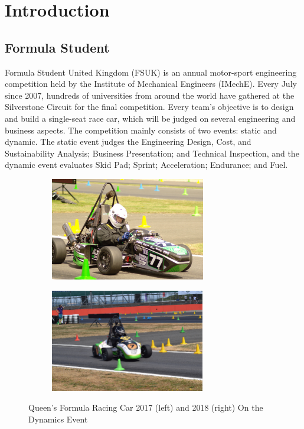 \newpage
\setcounter{page}{1}
\justifying
\noindent

\section{Introduction}
\subsection{Formula Student}
Formula Student United Kingdom (FSUK) is an annual motor-sport engineering competition held by the Institute of Mechanical Engineers (IMechE). Every July since 2007, hundreds of universities from around the world have gathered at the Silverstone Circuit for the final competition. Every team's objective is to design and build a single-seat race car, which will be judged on several engineering and business aspects. The competition mainly consists of two events: static and dynamic. The static event judges the Engineering  Design,  Cost, and  Sustainability  Analysis; Business Presentation; and Technical Inspection, and the dynamic event evaluates Skid Pad; Sprint; Acceleration; Endurance; and Fuel.

\begin{figure}[!ht]
\begin{center}
%    
  \begin{subfigure}[b]{0.45\textwidth}
    \includegraphics[height=4.5cm]{Figures/QFR17PHOTO.JPG}
  \end{subfigure}
  \begin{subfigure}[b]{0.45\textwidth}
    \includegraphics[height=4.5cm]{Figures/QFR18PHOTO.jpg}
  \end{subfigure}
%  
  \caption{Queen's Formula Racing Car 2017 (left) and 2018 (right) On the Dynamics Event}
    \label{fig:1}
\end{center}
\end{figure}

